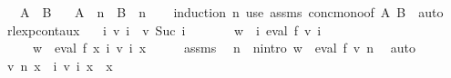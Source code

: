 \begin{isabellebody}
\ \ \ {\isachardoublequoteopen}A\ {\isasymsubseteq}\ B{\isachardoublequoteclose}\isanewline
\ \ \ {\isachardoublequoteopen}A\ {\isacharcircum}{\kern0pt}{\isacharcircum}{\kern0pt}\ n\ {\isasymsubseteq}\ B\ {\isacharcircum}{\kern0pt}{\isacharcircum}{\kern0pt}\ n{\isachardoublequoteclose}\isanewline
%
\isadelimproof
\ \ %
\endisadelimproof
%
\isatagproof
{}\isamarkupfalse%
\ {\isacharparenleft}{\kern0pt}induction\ n{\isacharparenright}{\kern0pt}\ {\isacharparenleft}{\kern0pt}use\ assms\ conc{\isacharunderscore}{\kern0pt}mono{\isacharbrackleft}{\kern0pt}of\ A\ B{\isacharbrackright}{\kern0pt}\ \ auto{\isacharparenright}{\kern0pt}%
\endisatagproof
{\isafoldproof}%
%
\isadelimproof
\isanewline
%
\endisadelimproof
\isanewline
{}\isamarkupfalse%
\ rlexp{\isacharunderscore}{\kern0pt}cont{\isacharunderscore}{\kern0pt}aux{}{\isacharcolon}{\kern0pt}\isanewline
\ \ \ {\isachardoublequoteopen}{\isasymforall}i{\isachardot}{\kern0pt}\ v\ i\ {\isasymle}\ v\ {\isacharparenleft}{\kern0pt}Suc\ i{\isacharparenright}{\kern0pt}{\isachardoublequoteclose}\isanewline
\ \ \ \ \ \ \ {\isachardoublequoteopen}w\ {\isasymin}\ {\isacharparenleft}{\kern0pt}{\isasymUnion}i{\isachardot}{\kern0pt}\ eval\ f\ {\isacharparenleft}{\kern0pt}v\ i{\isacharparenright}{\kern0pt}{\isacharparenright}{\kern0pt}{\isachardoublequoteclose}\isanewline
\ \ \ \ \ {\isachardoublequoteopen}w\ {\isasymin}\ eval\ f\ {\isacharparenleft}{\kern0pt}{\isasymlambda}x{\isachardot}{\kern0pt}\ {\isasymUnion}i{\isachardot}{\kern0pt}\ v\ i\ x{\isacharparenright}{\kern0pt}{\isachardoublequoteclose}\isanewline
%
\isadelimproof
%
\endisadelimproof
%
\isatagproof
{}\isamarkupfalse%
\ {\isacharminus}{\kern0pt}\isanewline
\ \ \isamarkupfalse%
\ assms{\isacharparenleft}{\kern0pt}{}{\isacharparenright}{\kern0pt}\ \isamarkupfalse%
\ n\ \ n{\isacharunderscore}{\kern0pt}intro{\isacharcolon}{\kern0pt}\ {\isachardoublequoteopen}w\ {\isasymin}\ eval\ f\ {\isacharparenleft}{\kern0pt}v\ n{\isacharparenright}{\kern0pt}{\isachardoublequoteclose}\ \isamarkupfalse%
\ auto\isanewline
\ \ \isamarkupfalse%
\ {\isachardoublequoteopen}v\ n\ x\ {\isasymsubseteq}\ {\isacharparenleft}{\kern0pt}{\isasymUnion}i{\isachardot}{\kern0pt}\ v\ i\ x{\isacharparenright}{\kern0pt}{\isachardoublequoteclose}\ \ x\ \isamarkupfalse%

\end{isabellebody}

